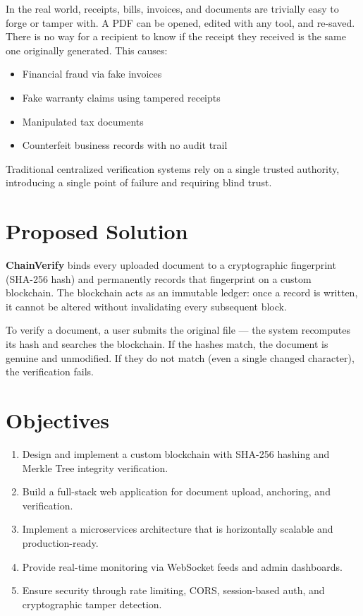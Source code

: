 \documentclass[12pt, a4paper]{report}
\begin{document}
In the real world, receipts, bills, invoices, and documents are trivially easy
to forge or tamper with. A PDF can be opened, edited with any tool, and
re-saved. There is no way for a recipient to know if the receipt they received
is the same one originally generated. This causes:

\begin{itemize}
    \item Financial fraud via fake invoices
    \item Fake warranty claims using tampered receipts
    \item Manipulated tax documents
    \item Counterfeit business records with no audit trail
\end{itemize}

Traditional centralized verification systems rely on a single trusted
authority, introducing a single point of failure and requiring blind trust.

\section{Proposed Solution}

\textbf{ChainVerify} binds every uploaded document to a cryptographic
fingerprint (SHA-256 hash) and permanently records that fingerprint on a custom
blockchain. The blockchain acts as an immutable ledger: once a record is
written, it cannot be altered without invalidating every subsequent block.

To verify a document, a user submits the original file — the system recomputes
its hash and searches the blockchain. If the hashes match, the document is
genuine and unmodified. If they do not match (even a single changed character),
the verification fails.

\section{Objectives}

\begin{enumerate}
    \item Design and implement a custom blockchain with SHA-256 hashing and
          Merkle Tree integrity verification.
    \item Build a full-stack web application for document upload, anchoring,
          and verification.
    \item Implement a microservices architecture that is horizontally scalable
          and production-ready.
    \item Provide real-time monitoring via WebSocket feeds and admin dashboards.
    \item Ensure security through rate limiting, CORS, session-based auth,
          and cryptographic tamper detection.
\end{enumerate}
\end{document}
